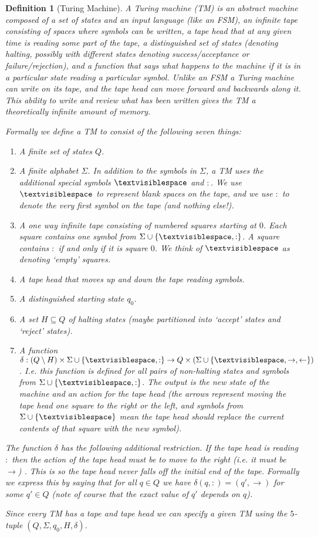 \documentclass{article}
\theoremstyle{plain}
\newtheorem{definition}[theorem]{Definition}{\bfseries}{\upshape}
\newcommand{\tvs}{\textvisiblespace}
\begin{document}
\begin{definition}[Turing Machine]
A Turing machine (TM) is an abstract machine composed of a set of states and an input language (like an FSM), an infinite tape consisting of spaces where symbols can be written, a tape head that at any given time is reading some part of the tape, a distinguished set of states (denoting halting, possibly with different states denoting success/acceptance or failure/rejection), and a function that says what happens to the machine if it is in a particular state reading a particular symbol. Unlike an FSM a Turing machine can write on its tape, and the tape head can move forward and backwards along it. This ability to write and review what has been written gives the TM a theoretically infinite amount of memory. 

Formally we define a TM to consist of the following seven things:
\begin{enumerate}
\item A finite set of states $Q$.
\item A finite alphabet $\Sigma$. In addition to the symbols in $\Sigma$, a TM uses the additional special symbols $\tvs$ and $:$. We use $\tvs$ to represent blank spaces on the tape, and we use $:$ to denote the very first symbol on the tape (and nothing else!).
\item A one way infinite tape consisting of numbered squares starting at $0$. Each square contains one symbol from $\Sigma\cup\{\tvs,:\}$. A square contains $:$ if and only if it is square $0$. We think of $\tvs$ as denoting `empty' squares.
\item A tape head that moves up and down the tape reading symbols. 
\item A distinguished starting state $q_0$.
\item A set $H\subseteq Q$ of halting states (maybe partitioned into `accept' states and `reject' states).
\item A function $\delta: (Q\setminus H)\times\Sigma\cup\{\tvs,:\} \to Q \times (\Sigma\cup\{\tvs,\rightarrow,\leftarrow\})$. I.e. this function is defined for all pairs of non-halting states and symbols from $\Sigma\cup\{\tvs,:\}$. The output is the new state of the machine and an action for the tape head (the arrows represent moving the tape head one square to the right or the left, and symbols from $\Sigma\cup\{\tvs\}$ mean the tape head should replace the current contents of that square with the new symbol).
\end{enumerate}

The function $\delta$ has the following additional restriction. If the tape head is reading $:$ then the action of the tape head must be to move to the right (i.e. it must be $\rightarrow$) . This is so the tape head never falls off the initial end of the tape. Formally we express this by saying that for all $q\in 
Q$ we have $\delta(q,:)=(q',\rightarrow)$ for some $q'\in Q$ (note of course that the exact value of $q'$ depends on $q$).

Since every TM has a tape and tape head we can specify a given TM using the $5$-tuple $(Q,\Sigma,q_0,H,\delta)$.
\end{definition}   
\end{document}
